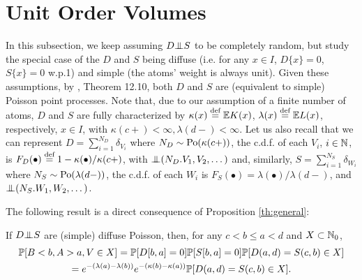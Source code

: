 \documentclass{aptpub}
\begin{document}
\section{Unit Order Volumes}
\label{sec:cru}

In this subsection, we keep assuming $D\indep S$ to be completely random, but study the special case of the $D$ and $S$ being diffuse (i.e. for any $x\in I$, $D\{x\}=0$, $S\{x\}=0$ w.p.1) and simple (the atoms' weight is always unit). Given these assumptions, by \cite{Kallenberg02}, Theorem 12.10, both $D$ and $S$ are (equivalent to simple) Poisson point processes. Note that, due to our assumption of a finite number of atoms, $D$ and $S$ are fully characterized by 
$\kappa(x)\stackrel{\text{def}}{=} \mathbb{E} K(x)$, $\lambda(x)\stackrel{\text{def}}{=}\mathbb{E} L(x)$, respectively, $x \in I$, with $\kappa(c+)<\infty,\lambda(d-) < \infty$. Let us also recall that we can represent $D=\sum_{i=1}^{N_D} \delta_{V_i}$ where ${N_D}\sim \mathrm{Po}(\kappa(c+))$, the c.d.f. of each $V_i$, $i\in \mathbb{N}$, is $F_D(\bullet)\stackrel{\text{def}}{=} 1-\kappa(\bullet)/\kappa(c+)$, with $\indep (N_D.V_1,V_2,\dots)$ and, similarly, $S=\sum_{i=1}^{N_S} \delta_{W_i}$ where ${N_S}\sim \mathrm{Po}(\lambda(d-))$, the c.d.f. of each $W_i$ is $F_S(\bullet)=\lambda(\bullet)/\lambda(d-)$, and $\indep (N_S.W_1,W_2,\dots)$. 

The following result is a direct consequence of Proposition \ref{th:general}:

\begin{proposition} If $D \indep S$ are (simple) diffuse Poisson, then, for any $c < b \leq a < d$ and $X \subset \mathbb{N}_0$,
\begin{multline}
\P[B<b,A>a,V\in X]=\P[ D[b,a] = 0 ]\P[ S[b,a] = 0]\P[D(a,d)=S(c,b)\in X]\\
= e^{-(\lambda(a)-\lambda(b))}e^{-(\kappa(b)-\kappa(a))}\P[D(a,d)=S(c,b)\in X].
\label{eq:pax}
\end{multline}
\end{proposition}
\end{document}
